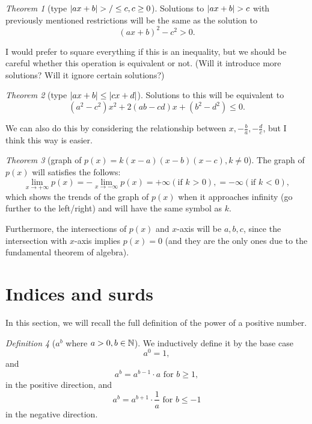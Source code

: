 \documentclass[8pt]{article}
\theoremstyle{remark}
\newtheorem{theorem}{Theorem}[section]
\newtheorem{definition}[theorem]{Definition}
\begin{document}
        \begin{theorem}[type $\left\lvert ax + b \right\rvert > / \leq c, c \geq 0$]
            Solutions to $\left\lvert ax + b \right\rvert > c$ with previously mentioned restrictions will be the same as the solution to
            $$
                (ax + b)^2 - c^2 > 0.
            $$

            I would prefer to square everything if this is an inequality, but we should be careful whether this operation is equivalent or not. (Will it introduce more solutions? Will it ignore certain solutions?)
        \end{theorem}

        \begin{theorem}[type $\left\lvert ax + b \right\rvert \leq \left\lvert cx + d \right\rvert$]
            Solutions to this will be equivalent to
            $$
            (a^2 - c^2) x^2 + 2(ab - cd)x + (b^2 - d^2) \leq 0.
            $$

            We can also do this by considering the relationship between $x, -\frac{b}{a}, -\frac{d}{c}$, but I think this way is easier.
        \end{theorem}

        \begin{theorem}[graph of $p(x) = k (x-a) (x-b) (x-c), k \neq 0$]
            The graph of $p(x)$ will satisfies the follows:
            $$
                \lim_{x \rightarrow +\infty} p(x) = - \lim_{x \rightarrow -\infty} p(x) = +\infty (\text{if $k$ > 0}), = -\infty (\text{if $k$ < 0}),
            $$
            which shows the trends of the graph of $p(x)$ when it approaches infinity (go further to the left/right) and will have the same symbol as $k$.

            Furthermore, the intersections of $p(x)$ and $x$-axis will be $ a, b, c$, since the intersection with $x$-axis implies $p(x) = 0$ (and they are the only ones due to the fundamental theorem of algebra).
        \end{theorem}

    \section{Indices and surds}
        In this section, we will recall the full definition of the power of a positive number.

        \begin{definition}[$a^b$ where $a > 0, b \in \mathbb{N}$]
            We inductively define it by the base case
            $$a^0 = 1,$$
            and $$a^b = a^{b - 1} \cdot a\text{ for } b \geq 1,$$
            in the positive direction, and
            $$a^b = a^{b + 1} \cdot \frac{1}{a}\text{ for } b \leq -1$$
            in the negative direction.
        \end{definition}
\end{document}
